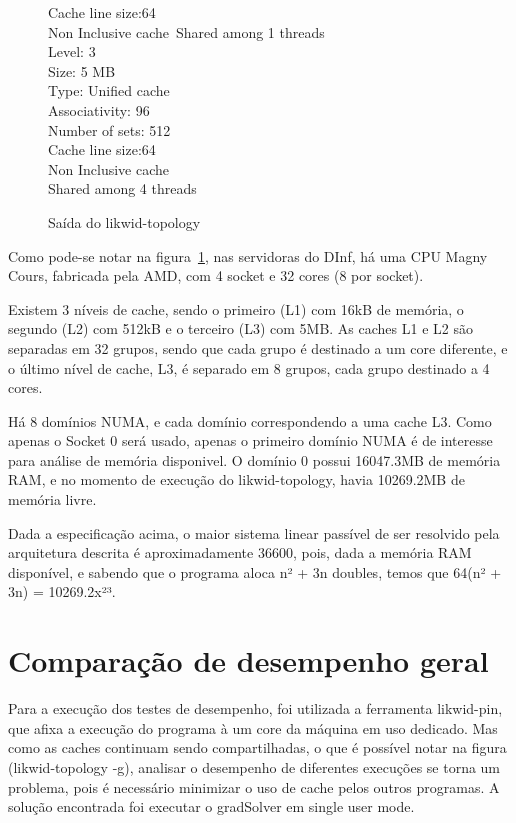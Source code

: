 \documentclass[12pt]{article}
\begin{document}
\begin{figure}[ht]
\begin{tt}
Cache line size:64\\
Non Inclusive cache\
Shared among 1 threads\\
Level:	3\\
Size:	5 MB\\
Type:	Unified cache\\
Associativity:	96\\
Number of sets:	512\\
Cache line size:64\\
Non Inclusive cache\\
Shared among 4 threads\\
\end{tt}\caption{Saída do likwid-topology}\label{fig:topologyOut}
\end{figure}

Como pode-se notar na figura~\ref{fig:topologyOut}, nas servidoras do DInf, há
uma CPU Magny Cours, fabricada pela AMD, com 4 socket e 32 cores (8 por socket).

Existem 3 níveis de cache, sendo o primeiro (L1) com 16kB de memória, o segundo
(L2) com 512kB e o terceiro (L3) com 5MB. As caches L1 e L2 são separadas em 32 grupos, sendo
que cada grupo é destinado a um core diferente, e o último nível de cache, L3, é
separado em 8 grupos, cada grupo destinado a 4 cores.

Há 8 domínios NUMA, e cada domínio correspondendo a uma cache L3. Como apenas o Socket 0 será
usado, apenas o primeiro domínio NUMA é de interesse para análise de memória disponivel. O 
domínio 0 possui 16047.3MB de memória RAM, e no momento de execução do likwid-topology,
havia 10269.2MB de memória livre.

Dada a especificação acima, o maior sistema linear passível de ser resolvido
pela arquitetura descrita é aproximadamente 36600, pois, dada a memória RAM disponível, e sabendo 
que o programa aloca n² + 3n doubles, temos que 64(n² + 3n) = 10269.2x²³.

\section{Comparação de desempenho geral}\label{sec:desempenhoGeral}

Para a execução dos testes de desempenho, foi utilizada a ferramenta likwid-pin,
que afixa a execução do programa à um core da máquina em uso dedicado. Mas como
as caches continuam sendo compartilhadas, o que é possível notar na figura
(likwid-topology -g), analisar o desempenho de diferentes execuções se torna um
problema, pois é necessário minimizar o uso de cache pelos outros programas. A
solução encontrada foi executar o gradSolver em single user mode.
\end{document}
